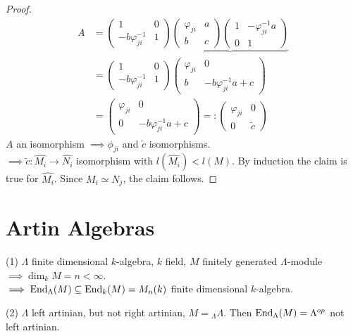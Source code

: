 \begin{proof}
\[
\begin{matrix}
A &= \begin{pmatrix}
1 & 0\\ 
-b\varphi_{ji}^{-1} & 1
\end{pmatrix}
\underbrace{\begin{pmatrix}
\varphi_{ji} & a\\b&c
\end{pmatrix}\begin{pmatrix}
 1 & -\varphi_{ji}^{-1}a\\ 0 & 1
\end{pmatrix}}\\
&= \begin{pmatrix}
1 & 0\\ 
-b\varphi_{ji}^{-1} & 1
\end{pmatrix}
\begin{pmatrix}
\varphi_{ji} & 0\\b & -b\varphi_{ji}^{-1}a + c
\end{pmatrix}\\
&= 
\begin{pmatrix}
\varphi_{ji} & 0\\0 & -b\varphi_{ji}^{-1}a + c 
\end{pmatrix} =:
\begin{pmatrix}
\varphi_{ji} & 0\\0 & \tilde{c}
\end{pmatrix}
\end{matrix}
\]
$A$ an isomorphism $\implies \phi_{ji}$ and $\tilde{c}$ isomorphisms.\\
$\implies \tilde{c}\colon  \hat{M_i} \to \hat{N_i}$ isomorphism with
$l(\hat{M_i}) < l(M)$. By induction the claim is true for
$\hat{M_i}$. Since $M_i \simeq N_j$, the claim follows.   
\end{proof}


\section{Artin Algebras}
\begin{recall}
(1) $\Lambda$ finite dimensional $k$-algebra, $k$ field, $M$
  finitely generated $\Lambda$-module $\implies \dim_k M = n <
  \infty$. \\
$\implies \operatorname{End}_\Lambda(M) \subseteq \operatorname{End}_k(M) = M_n(k)$ finite dimensional $k$-algebra.

(2) $\Lambda$ left artinian, but not right artinian, $M =
{_\Lambda\Lambda}$. Then $\operatorname{End}_\Lambda(M) = \Lambda^{op}$ not left
artinian.  
\end{recall}

